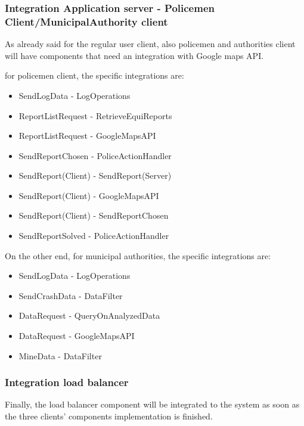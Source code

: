 \subsubsection{Integration Application server - Policemen Client/MunicipalAuthority client}
As already said for the regular user client, also policemen and authorities client will have components that need an integration with Google maps API. \\ \par
for policemen client, the specific integrations are:
\begin{itemize}
	\item SendLogData - LogOperations	
	\item ReportListRequest - RetrieveEquiReports
	\item ReportListRequest - GoogleMapsAPI
	\item SendReportChosen - PoliceActionHandler
	\item SendReport(Client) - SendReport(Server)
	\item SendReport(Client) - GoogleMapsAPI
	\item SendReport(Client) - SendReportChosen
	\item SendReportSolved - PoliceActionHandler
\end{itemize}
On the other end, for municipal authorities, the specific integrations are:
\begin{itemize}
	\item SendLogData - LogOperations
	\item SendCrashData - DataFilter	
	\item DataRequest - QueryOnAnalyzedData
	\item DataRequest - GoogleMapsAPI
	\item MineData - DataFilter
\end{itemize}

\subsubsection{Integration load balancer}
Finally, the load balancer component will be integrated to the system as soon as the three clients' components implementation is finished.
